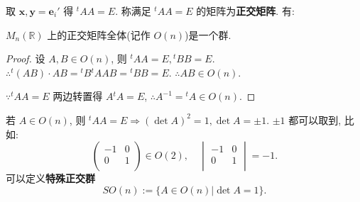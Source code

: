 \documentclass{ctexart}
\begin{document}
取 $\boldsymbol{x},\boldsymbol{y}=\boldsymbol{e}_i'$ 得 ${}^tAA=E$. 称满足 ${}^tAA=E$ 的矩阵为\textbf{正交矩阵}. 有:
\begin{theorem}\label{t1.3}
    $M_n(\mathbb{R})$ 上的正交矩阵全体(记作 $O(n)$)是一个群.
\end{theorem}
\begin{proof}
    设 $A,B\in O(n)$, 则 ${}^tAA=E,{}^tBB=E$. $\therefore{}^t(AB)\cdot AB={}^tB{}^tAAB={}^tBB=E$. $\therefore AB\in O(n)$.

    $\because{}^tAA=E$ 两边转置得 $A{}^tA=E$, $\therefore A^{-1}={}^tA\in O(n)$.
\end{proof}
若 $A\in O(n)$, 则 ${}^tAA=E\Rightarrow(\det A)^2=1,\det A=\pm1$. $\pm1$ 都可以取到, 比如:
\[\begin{pmatrix}
    -1 & 0 \\
    0 & 1 \\
\end{pmatrix}\in O(2),\quad\begin{vmatrix}
    -1 & 0 \\
    0 & 1 \\
\end{vmatrix}=-1.\]
可以定义\textbf{特殊正交群}
\[SO(n):=\{A\in O(n)|\det A=1\}.\]
\end{document}
